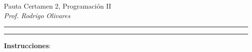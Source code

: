 \documentclass[10pt]{article}
\begin{document}
    \begin{center}
        {\Large Pauta Certamen 2, Programaci\'on II} \\
        \emph{\small Prof. Rodrigo Olivares} \\
    \end{center}
    \vspace*{-35pt}
    \begin{center}
        \rule{1\textwidth}{.3pt}
    \end{center}
    \vspace*{-42pt}
    \begin{center}
        \rule{1\textwidth}{2pt}
    \end{center}

    \vspace*{-15pt}
    {\small \textbf{Instrucciones}:}
    \vspace*{-15pt}
\end{document}
